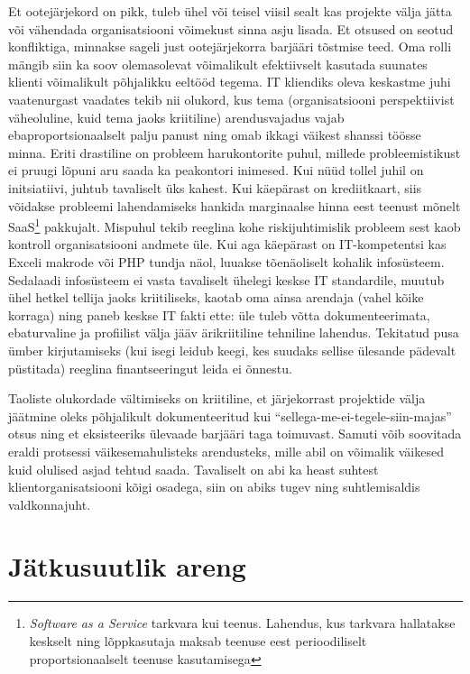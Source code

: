 \documentclass{tufte-book}
\begin{document}
Et ootejärjekord on pikk, tuleb ühel või teisel viisil sealt kas projekte välja jätta või vähendada organisatsiooni võimekust sinna asju lisada. Et otsused on seotud konfliktiga, minnakse sageli just ootejärjekorra barjääri tõstmise teed. Oma rolli mängib siin ka soov olemasolevat võimalikult efektiivselt kasutada suunates klienti võimalikult põhjalikku eeltööd tegema. IT kliendiks oleva keskastme juhi vaatenurgast vaadates tekib nii olukord, kus tema (organisatsiooni perspektiivist väheoluline, kuid tema jaoks kriitiline) arendusvajadus vajab ebaproportsionaalselt palju panust ning omab ikkagi väikest shanssi töösse minna. Eriti drastiline on probleem harukontorite puhul, millede probleemistikust ei pruugi lõpuni aru saada ka peakontori inimesed. Kui nüüd tollel juhil on initsiatiivi, juhtub tavaliselt üks kahest. Kui käepärast on krediitkaart, siis võidakse probleemi lahendamiseks hankida marginaalse hinna eest teenust mõnelt SaaS\footnote{\emph{Software as a Service} tarkvara kui teenus. Lahendus, kus tarkvara hallatakse keskselt ning lõppkasutaja maksab teenuse eest perioodiliselt proportsionaalselt teenuse kasutamisega} pakkujalt. Mispuhul tekib reeglina kohe riskijuhtimislik probleem sest kaob kontroll organisatsiooni andmete üle. Kui aga käepärast on IT-kompetentsi kas Exceli makrode või PHP tundja näol, luuakse tõenäoliselt kohalik infosüsteem. Sedalaadi infosüsteem ei vasta tavaliselt ühelegi keskse IT standardile, muutub ühel hetkel tellija jaoks kriitiliseks, kaotab oma ainsa arendaja (vahel kõike korraga) ning paneb keskse IT fakti ette: üle tuleb võtta dokumenteerimata, ebaturvaline ja profiilist välja jääv ärikriitiline tehniline lahendus. Tekitatud pusa ümber kirjutamiseks (kui isegi leidub keegi, kes suudaks sellise ülesande pädevalt püstitada) reeglina finantseeringut leida ei õnnestu. 

Taoliste olukordade vältimiseks on kriitiline, et järjekorrast projektide välja jäätmine oleks põhjalikult dokumenteeritud kui \enquote{sellega-me-ei-tegele-siin-majas} otsus ning et eksisteeriks ülevaade barjääri taga toimuvast. Samuti võib soovitada eraldi protsessi väikesemahulisteks arendusteks, mille abil on võimalik väikesed kuid olulised asjad tehtud saada. Tavaliselt on abi ka heast suhtest klientorganisatsiooni kõigi osadega, siin on abiks tugev ning suhtlemisaldis valdkonnajuht.

\chapter{Jätkusuutlik areng}
\end{document}
